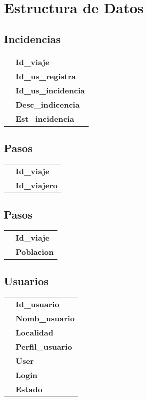\section{Estructura de Datos}
\begin{multicols}{2}
\subsection{Incidencias}
\begin{Table}
	\raggedright
	\label{struct:incidencias}
	\begin{tabular}{rl}
			\intc & \textbf{Id\_viaje}\\
			\intc & \textbf{Id\_us\_registra}\\
			\intc & \textbf{Id\_us\_incidencia}\\
			\charcp & \textbf{Desc\_indicencia}\\
			\intc & \textbf{Est\_incidencia}
		\end{tabular}
	\end{Table}
\subsection{Pasos}
\begin{Table}
	\raggedright
	\label{struct:pasajeros}
	\begin{tabular}{rl}
		\intc   & \textbf{Id\_viaje}\\
		\intc & \textbf{Id\_viajero}
	\end{tabular}
\end{Table}
\subsection{Pasos}
\begin{Table}
	\raggedright
	\label{struct:pasos}
	\begin{tabular}{rl}
		\intc   & \textbf{Id\_viaje}\\
		\charcp & \textbf{Poblacion}
	\end{tabular}
\end{Table}
\subsection{Usuarios}
\begin{Table}
	\raggedright
	\label{struct:usuarios}
	\begin{tabular}{rl}
		\intc & \textbf{Id\_usuario}\\
		\charcp & \textbf{Nomb\_usuario}\\
		\charcp & \textbf{Localidad}\\
		\intc & \textbf{Perfil\_usuario}\\
		\charcp & \textbf{User}\\
		\charcp & \textbf{Login}\\
		\intc & \textbf{Estado}
	\end{tabular}
\end{Table}

\end{multicols}
